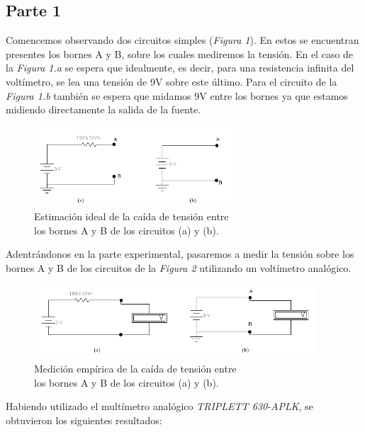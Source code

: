 \documentclass{article}
\begin{document}
\subsection{Parte 1}

	Comencemos observando dos circuitos simples (\textit{Figura 1}). En estos se encuentran presentes los bornes A y B, sobre los cuales mediremos la tensión. En el caso de la \textit{Figura 1.a} se espera que idealmente, es decir, para una resistencia infinita del voltímetro, se lea una tensión de 9V sobre este último. Para el circuito de la \textit{Figura 1.b} también se espera que midamos 9V entre los bornes ya que estamos midiendo directamente la salida de la fuente.
\bigskip

\begin{figure}[h]
	\centering
	\includegraphics[width=0.66\textwidth]{images/p1-item-1.jpg}
	\caption{Estimación ideal de la caída de tensión entre\\ los bornes A y B de los circuitos (a) y (b).}
\end{figure}
\bigskip


	Adentrándonos en la parte experimental, pasaremos a medir la tensión sobre los bornes A y B de los circuitos de la \textit{Figura 2} utilizando un voltímetro analógico.
\bigskip

\begin{figure}[h]
	\centering
	\includegraphics[width=0.94\textwidth]{images/p1-item-2.jpg}
	\caption{Medición empírica de la caída de tensión entre\\ los bornes A y B de los circuitos (a) y (b).}
\end{figure}
\bigskip


\noindent Habiendo utilizado el multímetro analógico \textit{TRIPLETT 630-APLK}, se obtuvieron los siguientes resultados:
\bigskip
\end{document}
